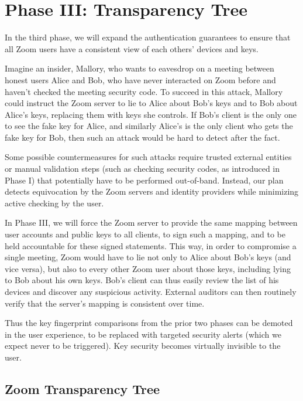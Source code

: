 \section{Phase III: Transparency Tree}

In the third phase, we will expand the authentication guarantees to ensure that all Zoom users have a consistent view of each others' devices and keys.

Imagine an insider, Mallory, who wants to eavesdrop on a meeting between honest users Alice and Bob, who have never interacted on Zoom before and haven't checked the meeting security code. To succeed in this attack, Mallory could instruct the Zoom server to lie to Alice about Bob's keys and to Bob about Alice's keys, replacing them with keys she controls. If Bob's client is the only one to see the fake key for Alice, and similarly Alice's is the only client who gets the fake key for Bob, then such an attack would be hard to detect after the fact.

Some possible countermeasures for such attacks require trusted external entities or manual validation steps (such as checking security codes, as introduced in Phase I) that potentially have to be performed out-of-band. Instead, our plan detects equivocation by the Zoom servers and identity providers while minimizing active checking by the user.

In Phase III, we will force the Zoom server to provide the same mapping between user accounts and public keys to all clients, to sign such a mapping, and to be held accountable for these signed statements. This way, in order to compromise a single meeting, Zoom would have to lie not only to Alice about Bob's keys (and vice versa), but also to every other Zoom user about those keys, including lying to Bob about his own keys. Bob's client can thus easily review the list of his devices and discover any suspicious activity. External auditors can then routinely verify that the server's mapping is consistent over time.

Thus the key fingerprint comparisons from the prior two phases can be demoted in the user experience, to be replaced with targeted security alerts (which we expect never to be triggered). Key security becomes virtually invisible to the user.

\subsection{Zoom Transparency Tree}

